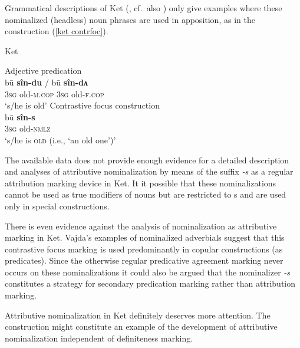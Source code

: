 Grammatical descriptions of Ket (\citealt{vajda2004}, cf.~also \citealt{krukova2007}) only give examples where these nominalized (headless) noun phrases are used in apposition, as in the  construction (\ref{ket contrfoc}). 
\begin{exe}
\ex 
\label{ket contrfoc}
\rm{Ket \citep{vajda2005}} 
\begin{xlist}
\ex	
\rm{Adjective predication}\\
\gll	bū \textbf{sîn-du} / bū \textbf{sîn-dʌ}\\
	3\textsc{sg} old-\textsc{m.cop} { } 3\textsc{sg} old-\textsc{f.cop}\\
\glt	‘s/he is old’
\ex	
\rm{Contrastive focus construction}\\
\gll	bū \textbf{sîn-s}\\
	3\textsc{sg} old-\textsc{nmlz}\\
\glt	‘s/he is \textsc{old} (i.e., ‘an old one’)’
\end{xlist}
\end{exe}
The available data does not provide enough evidence for a detailed description and analyses of attributive nominalization by means of the suffix \textit{-s} as a regular attribution marking device in Ket. It it possible that these nominalizations cannot be used as true modifiers of nouns but are restricted to s and are used only in special  constructions.

There is even evidence against the analysis of nominalization as attributive marking in Ket. Vajda's examples of nominalized adverbials suggest that this contrastive focus marking is used predominantly in copular constructions (as predicates). Since the otherwise regular predicative agreement marking never occurs on these nominalizations \citep[15]{vajda2004} it could also be argued that the nominalizer \textit{-s} constitutes a strategy for secondary predication marking rather than attribution marking.

Attributive nominalization in Ket definitely deserves more attention. The construction might constitute an example of the development of attributive nominalization independent of definiteness marking.

